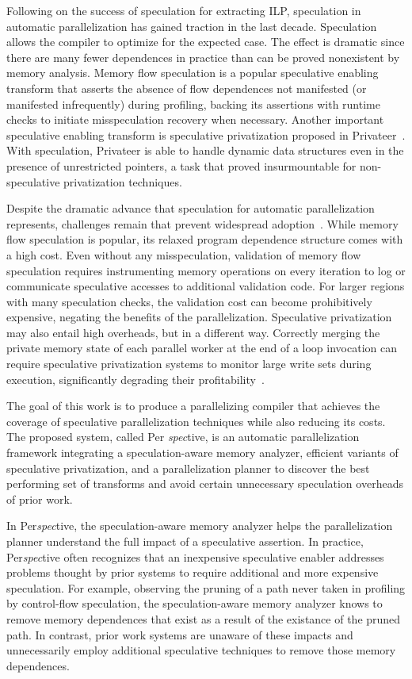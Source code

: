Following on the success of speculation for extracting ILP,
speculation in automatic parallelization has gained traction in the
last decade.  Speculation allows the compiler to optimize for the
expected case.  The effect is dramatic since there are many
fewer dependences in practice than can be proved nonexistent by memory
analysis.  Memory flow speculation is a popular speculative enabling
transform that asserts the absence of flow dependences not manifested
(or manifested infrequently) during profiling, backing its assertions
with runtime checks to initiate misspeculation recovery when
necessary.  Another important speculative enabling transform is
speculative privatization proposed in
Privateer~\cite{johnson:12:pldi}.  With speculation,
Privateer is able to handle dynamic data structures even in the
presence of unrestricted pointers, a task that proved insurmountable
for non-speculative privatization techniques.

Despite the dramatic advance that speculation for automatic
parallelization represents, challenges remain that prevent widespread
adoption~\cite{cascaval:08:stmtoy:short,prabhu:03:ppopp,kelsey:09:cgo}.
While memory flow speculation is popular, its relaxed program
dependence structure comes with a high cost.  Even without any
misspeculation, validation of memory flow speculation requires
instrumenting memory operations on every iteration to log or
communicate speculative accesses to additional validation code.  For
larger regions with many speculation checks, the validation cost can
become prohibitively expensive, negating the benefits of the
parallelization.  Speculative privatization may also entail high
overheads, but in a different way.  Correctly merging the private memory
state of each parallel worker at the end of a loop invocation can
require speculative privatization systems to monitor large write sets
during execution, significantly degrading their
profitability~\cite{kim:12:cgo,johnson:12:pldi,rauchwerger:99:pds}.

The goal of this work is to produce a parallelizing compiler that
achieves the coverage of speculative parallelization techniques while
also reducing its costs.  The proposed system, called Per{\em
  spec}tive, is an automatic parallelization framework integrating a
speculation-aware memory analyzer, efficient variants of speculative
privatization, and a parallelization planner to discover the best
performing set of transforms and avoid certain unnecessary
speculation overheads of prior work.

In Per{\em spec}tive, the speculation-aware memory analyzer helps the
parallelization planner understand the full impact of a speculative
assertion.  In practice, Per{\em spec}tive often recognizes that an
inexpensive speculative enabler addresses problems thought by prior
systems to require additional and more expensive speculation.  For
example, observing the pruning of a path never taken in profiling by
control-flow speculation, the speculation-aware memory analyzer knows
to remove memory dependences that exist as a result of the existance
of the pruned path.  In contrast, prior work systems are unaware of
these impacts and unnecessarily employ additional speculative
techniques to remove those memory dependences.

